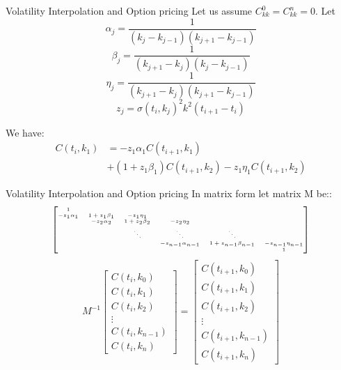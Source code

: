 \documentclass[10pt,table,mathserif]{beamer}
\begin{document}
\begin{frame}{Volatility Interpolation and Option pricing}
Let us assume $C_{kk}^0=C_{kk}^n=0$. Let 
\[
\alpha_{j}=\frac{1}{(k_{j}-k_{j-1})(k_{j+1}-k_{j-1})}
\]
\[
\beta_{j}=\frac{1}{(k_{j+1}-k_{j})(k_{j}-k_{j-1})}
\]
\[
\eta_{j}=\frac{1}{(k_{j+1}-k_{j})(k_{j+1}-k_{j-1})}
\]
\[
z_j=\sigma(t_i,k_j)^2 k^2 (t_{i+1}-t_{i})
\]

We have:
\[\begin{split}
C(t_{i},k_1)&=-z_1 \alpha_{1}C(t_{i+1},k_1) \\
&+ (1+z_1\beta_{1}) C(t_{i+1},k_2) -z_1\eta_{1} C(t_{i+1},k_2)
\end{split}
\]
\end{frame}



\begin{frame}{Volatility Interpolation and Option pricing}
In matrix form let matrix M be::
\[\tiny
\begin{bmatrix} 
1&  \\
-z_1 \alpha_{1}
& 1+z_1\beta_{1} 
&-z_1\eta_{1}\\
&-z_2 \alpha_{2}
& 1+z_2\beta_{2} 
&-z_2\eta_{2}\\
& & \ddots&\ddots&\ddots \\
&&	&-z_{n-1} \alpha_{n-1}
& 1+z_{n-1}\beta_{n-1}
&-z_{n-1}\eta_{n-1}\\
&&&&&1
\end{bmatrix}
\]
\[M^{-1}\begin{bmatrix}
C(t_{i},k_0)\\
C(t_{i},k_1)\\
C(t_{i},k_2)\\
\vdots\\
C(t_{i},k_{n-1}) \\
C(t_{i},k_{n})
\end{bmatrix}=
\begin{bmatrix}
C(t_{i+1},k_0)\\
C(t_{i+1},k_1)\\
C(t_{i+1},k_2)\\
\vdots\\
C(t_{i+1},k_{n-1}) \\
C(t_{i+1},k_{n})
\end{bmatrix}
\]
\end{frame}
\end{document}
